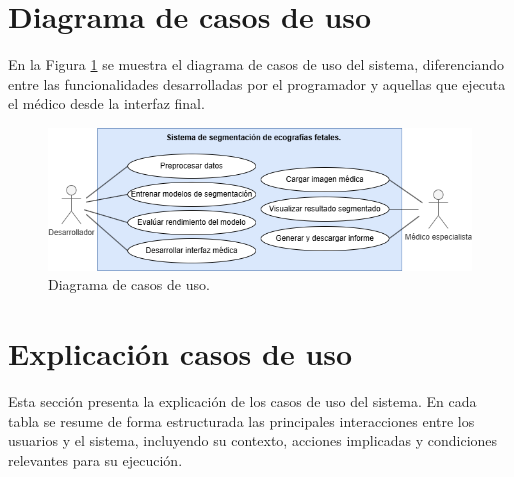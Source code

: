 

\section{Diagrama de casos de uso}
En la Figura \ref{fig: diagrama_casos_uso} se muestra el diagrama de casos de uso del sistema, diferenciando entre las funcionalidades desarrolladas por el programador y aquellas que ejecuta el médico desde la interfaz final. 
\begin{figure}[h]
    \centering
    \includegraphics[width=1.1\textwidth]{img/diagrama_casos_usos.png}
    \caption{Diagrama de casos de uso.}
    \label{fig: diagrama_casos_uso}
\end{figure}

\section{Explicación casos de uso}
Esta sección presenta la explicación de los casos de uso del sistema. En cada tabla se resume de forma estructurada las principales interacciones entre los usuarios y el sistema, incluyendo su contexto, acciones implicadas y condiciones relevantes para su ejecución.

